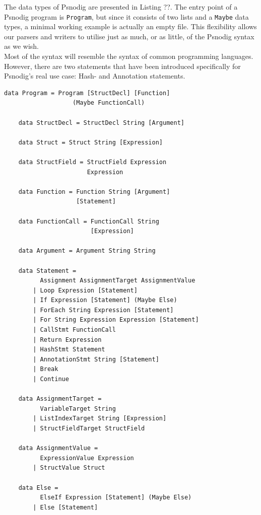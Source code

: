 
The data types of Psnodig are presented in Listing ??. The entry point of a Psnodig program is \texttt{Program}, but since it consists of two lists and a \texttt{Maybe} data types, a minimal working example is actually an empty file. This flexibility allows our parsers and writers to utilise just as much, or as little, of the Psnodig syntax as we wish. \hfill \\

Most of the syntax will resemble the syntax of common programming languages. However, there are two statements that have been introduced specifically for Psnodig's real use case: Hash- and Annotation statements. \hfill \\

\begin{lstlisting}[caption={Psnodig's data types in Haskell}, captionpos=b, frame=trbl]
    data Program = Program [StructDecl] [Function]
                   (Maybe FunctionCall)

    data StructDecl = StructDecl String [Argument]

    data Struct = Struct String [Expression]

    data StructField = StructField Expression
                       Expression

    data Function = Function String [Argument]
                    [Statement]

    data FunctionCall = FunctionCall String
                        [Expression]

    data Argument = Argument String String

    data Statement =
          Assignment AssignmentTarget AssignmentValue
        | Loop Expression [Statement]
        | If Expression [Statement] (Maybe Else)
        | ForEach String Expression [Statement]
        | For String Expression Expression [Statement]
        | CallStmt FunctionCall
        | Return Expression
        | HashStmt Statement
        | AnnotationStmt String [Statement]
        | Break
        | Continue

    data AssignmentTarget =
          VariableTarget String
        | ListIndexTarget String [Expression]
        | StructFieldTarget StructField

    data AssignmentValue =
          ExpressionValue Expression
        | StructValue Struct

    data Else =
          ElseIf Expression [Statement] (Maybe Else)
        | Else [Statement]


\end{lstlisting}
